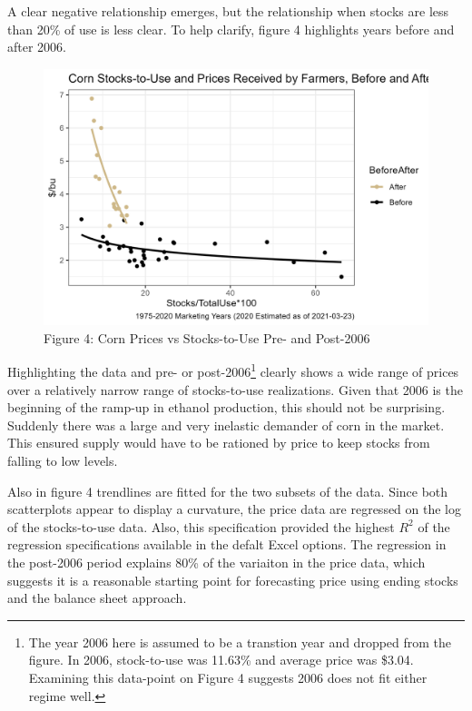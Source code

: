\documentclass[
  letterpaper,
  DIV=11,
  numbers=noendperiod]{scrreprt}
\begin{document}
A clear negative relationship emerges, but the relationship when stocks
are less than 20\% of use is less clear. To help clarify, figure 4
highlights years before and after 2006.

\begin{figure}

{\centering \includegraphics{assets/EndingStocksand-StocksUsePrices3.png}

}

\caption{Figure 4: Corn Prices vs Stocks-to-Use Pre- and Post-2006}

\end{figure}

Highlighting the data and pre- or post-2006\footnote{The year 2006 here
  is assumed to be a transtion year and dropped from the figure. In
  2006, stock-to-use was 11.63\% and average price was \$3.04. Examining
  this data-point on Figure 4 suggests 2006 does not fit either regime
  well.} clearly shows a wide range of prices over a relatively narrow
range of stocks-to-use realizations. Given that 2006 is the beginning of
the ramp-up in ethanol production, this should not be surprising.
Suddenly there was a large and very inelastic demander of corn in the
market. This ensured supply would have to be rationed by price to keep
stocks from falling to low levels.

Also in figure 4 trendlines are fitted for the two subsets of the data.
Since both scatterplots appear to display a curvature, the price data
are regressed on the log of the stocks-to-use data. Also, this
specification provided the highest \(R^2\) of the regression
specifications available in the defalt Excel options. The regression in
the post-2006 period explains 80\% of the variaiton in the price data,
which suggests it is a reasonable starting point for forecasting price
using ending stocks and the balance sheet approach.
\end{document}
